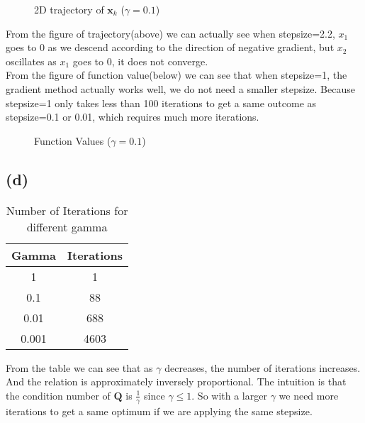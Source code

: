 \documentclass[12pt,letterpaper]{article}
\begin{document}
\begin{figure}[H]
\centering
{}
\caption{2D trajectory of $\boldsymbol{x}_k$ ($\gamma=0.1$)}
\label{tr}
\end{figure}
From the figure of trajectory(above) we can actually see when stepsize=2.2, $x_1$ goes to $0$ as we descend according to the direction of negative gradient, but $x_2$ oscillates as $x_1$ goes to $0$, it does not converge.\\
From the figure of function value(below) we can see that when stepsize=1, the gradient method actually works well, we do not need a smaller stepsize. Because stepsize=1 only takes less than 100 iterations to get a same outcome as stepsize=0.1 or 0.01, which requires much more iterations.
\begin{figure}[H]
\centering
{}
\caption{Function Values ($\gamma=0.1$)}
\label{function value}
\end{figure}

\subsection*{(d)}
\begin{table}[h]
    \centering
    \begin{tabular}{c|c}
         Gamma&Iterations  \\\hline
         1&1\\
         0.1&88\\
         0.01&688\\
         0.001&4603
    \end{tabular}
    \caption{Number of Iterations for different gamma}
    \label{various gamma}
\end{table}
From the table we can see that as $\gamma$ decreases, the number of iterations increases. And the relation is approximately inversely proportional. The intuition is that the condition number of $\boldsymbol{Q}$ is $\frac{1}{\gamma}$ since $\gamma\leq1$.  So with a larger $\gamma$ we need more iterations to get a same optimum if we are applying the same stepsize.
\end{document}
